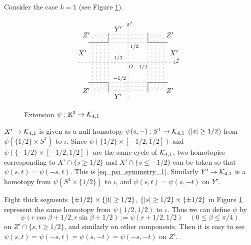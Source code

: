\begin{ex}\label{ex_outside_zero}
Consider the case $k=1$ (see Figure \ref{fig_outside_zero}).
\begin{figure}[htb]
\[
 \begin{xy}%
 {\ar@{.>}(-25,0);(25,0)^(.38){-1/2}^>{s}_(.53){O}_(.65){1/2}},{\ar@{.>}(0,-20);(0,20)^(.3){-1/2}_(.7){1/2}_>{t}},
 {\ar@{-}(-20,10);(-10,10)},{\ar@{-}(-10,10);(-10,15)},
 {\ar@{.}(-10,12);(-12,10)},{\ar@{.}(-10,14);(-14,10)},{\ar@{.}(-12,14);(-16,10)},{\ar@{.}(-14,14);(-18,10)},
  {\ar@{.}(-16,14);(-18,12)},
 {\ar@{-}(20,10);(10,10)},{\ar@{-}(10,10);(10,15)},
 {\ar@{.}(10,12);(12,10)},{\ar@{.}(10,14);(14,10)},{\ar@{.}(12,14);(16,10)},{\ar@{.}(14,14);(18,10)},
  {\ar@{.}(16,14);(18,12)},
 {\ar@{-}(-20,-10);(-10,-10)},{\ar@{-}(-10,-10);(-10,-15)},
 {\ar@{.}(-10,-12);(-12,-10)},{\ar@{.}(-10,-14);(-14,-10)},{\ar@{.}(-12,-14);(-16,-10)},{\ar@{.}(-14,-14);(-18,-10)},
  {\ar@{.}(-16,-14);(-18,-12)},
 {\ar@{-}(20,-10);(10,-10)},{\ar@{-}(10,-10);(10,-15)},
 {\ar@{.}(10,-12);(12,-10)},{\ar@{.}(10,-14);(14,-10)},{\ar@{.}(12,-14);(16,-10)},{\ar@{.}(14,-14);(18,-10)},
  {\ar@{.}(16,-14);(18,-12)},
 {\ar@{.}(-10,10);(-10,-10)}, {\ar@{.}(-10,-10);(10,-10)}, {\ar@{.}(10,-10);(10,10)}, {\ar@{.}(10,10);(-10,10)},
 {\ar@{.}(-12,10);(-12,-10)}, {\ar@{.}(-14,10);(-14,-10)}, {\ar@{.}(-16,10);(-16,-10)}, {\ar@{.}(-18,10);(-18,-10)},
 {\ar@{.}(12,10);(12,-10)}, {\ar@{.}(14,10);(14,-10)}, {\ar@{.}(16,10);(16,-10)}, {\ar@{.}(18,10);(18,-10)},
 {\ar@{.}(10,12);(-10,12)}, {\ar@{.}(10,14);(-10,14)},
 {\ar@{.}(10,-12);(-10,-12)}, {\ar@{.}(10,-14);(-10,-14)},
 (23,5)*{X'},(-23,5)*{X'}, (-5,17)*{Y'},(-5,-17)*{Y'},
 (21,14)*{Z'},(-21,14)*{Z'},(21,-14)*{Z'},(-21,-14)*{Z'}
 \end{xy}
\]
\caption{Extension $\psi : \mathbb{R}^2 \to \mathcal{K}_{4 ,1}$}
\label{fig_outside_zero}
\end{figure}
$X'\to \mathcal{K}_{4 ,1}$ is given as a null homotopy $\psi(s,-) :S^1 \to \mathcal{K}_{4 ,1}$ ($\lvert {s} \rvert\ge 1/2$) from
$\psi (\{ 1/2\} \times S^1 )$ to $\iota$.
Since $\psi (\{ 1/2 \} \times [-1/2,1/2])$ and $\psi (\{ -1/2 \} \times [-1/2,1/2])$ are the same cycle of $\mathcal{K}_{4 ,1}$,
two homotopies corresponding to $X' \cap \{ s\ge 1/2\}$ and  $X' \cap \{ s\le -1/2\}$ can be taken so that
$\psi (s,t)=\psi (-s,t)$.
This is \eqref{eq_psi_symmetry_1}.
Similarly $Y'\to \mathcal{K}_{4 ,1}$ is a homotopy from $\psi (S^1 \times \{ 1/2\} )$ to $\iota$, and $\psi (s,t)=\psi (s,-t)$
on $Y'$.


Eight thick segments $\{ \pm 1/2\} \times \{ \lvert {t} \rvert\ge 1/2\}$, $\{ \lvert {s} \rvert\ge 1/2\} \times \{ \pm 1/2\}$ in
Figure \ref{fig_outside_zero} represent the same homotopy from $\psi (1/2, 1/2 )$ to $\iota$.
Thus we can define $\psi$ by
\[
 \psi (r\cos \beta +1/2 ,r\sin \beta +1/2):= \psi (r+1/2 ,1/2) \quad (0 \le \beta \le \pi /4)
\]
on $Z' \cap \{ s,t \ge 1/2\}$, and similarly on other components.
Then it is easy to see $\psi (s,t)=\psi (-s,t)=\psi (s,-t)=\psi (-s,-t)$ on $Z'$.
\end{ex}


